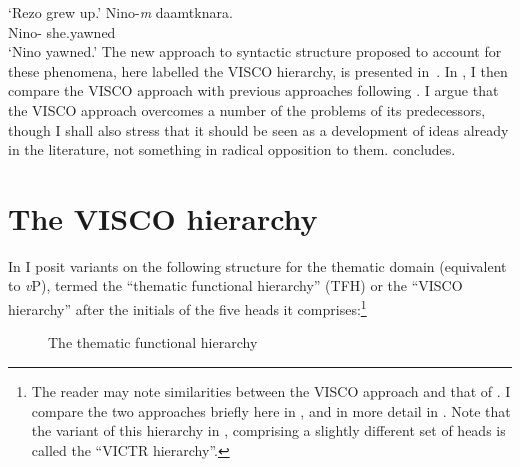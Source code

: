 \documentclass[output=paper]{langsci/langscibook}
\begin{document}
        \glt    \enquote*{Rezo grew up.} \parencite[293]{Harris1982}
    \ex
        \gll    Nino-\textit{m} daamtknara.\\
                Nino-\Erg{} she.yawned\\
        \glt    \enquote*{Nino yawned.} \parencite[147]{Harris1981}
    \z
\z
The new approach to syntactic structure proposed to account for these
phenomena, here labelled the VISCO hierarchy, is presented
in~.  In , I then compare the VISCO approach with previous
approaches  following  . I
argue that the VISCO approach overcomes a number of the problems of its
predecessors, though I shall also stress that it should be seen as a
development of ideas already in the literature, not something in radical
opposition to them.  concludes.

\section{The VISCO hierarchy}\label{sec:visco}

In \textcite{Baker2016,Baker2018,Baker2019} I posit variants on the following
structure for the thematic domain (equivalent to \emph{v}P), termed the
\enquote{thematic functional hierarchy} (\gls{TFH}) or the
\enquote{VISCO hierarchy} after the initials of the five heads it
comprises:\footnote{The reader may note similarities between the VISCO approach
    and that of \citet{Ramchand2008}. I compare the two approaches briefly here
    in , and in more detail in \citet{Baker2018}. Note that the variant
of this hierarchy in \textcite{Baker2018}, comprising a slightly different
set of heads is called the \enquote{VICTR hierarchy}.}

\begin{figure}
    \caption{The thematic functional hierarchy\label{fig:baker:2}}
\end{figure}
\end{document}
